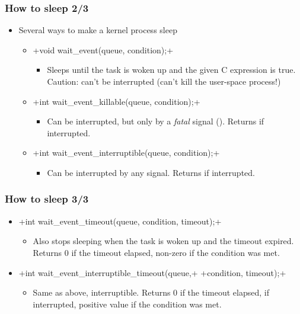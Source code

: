 \begin{frame}[fragile]
  \frametitle{How to sleep 2/3}
  \begin{itemize}
  \item Several ways to make a kernel process sleep
    \begin{itemize}
    \item {}+void wait_event(queue, condition);+
      \begin{itemize}
      \item Sleeps until the task is woken up and the given C
        expression is true. Caution: can't be interrupted (can't kill
        the user-space process!)
      \end{itemize}
    \item {}+int wait_event_killable(queue, condition);+
      \begin{itemize}
      \item Can be interrupted, but only by a \emph{fatal} signal
        (). Returns  if interrupted.
      \end{itemize}
    \item {}+int wait_event_interruptible(queue, condition);+
      \begin{itemize}
      \item Can be interrupted by any signal. Returns
         if interrupted.
      \end{itemize}
    \end{itemize}
  \end{itemize}
\end{frame}

\begin{frame}[fragile]
  \frametitle{How to sleep 3/3}
  \begin{itemize}
  \item {}+int wait_event_timeout(queue, condition, timeout);+
    \begin{itemize}
    \item Also stops sleeping when the task is woken up and the
      timeout expired. Returns 0 if the timeout elapsed, non-zero if
      the condition was met.
    \end{itemize}
  \item {}+int wait_event_interruptible_timeout(queue,+
    +condition, timeout);+
    \begin{itemize}
    \item Same as above, interruptible. Returns 0 if the timeout
      elapsed,  if interrupted, positive value if
      the condition was met.
    \end{itemize}
  \end{itemize}
\end{frame}

